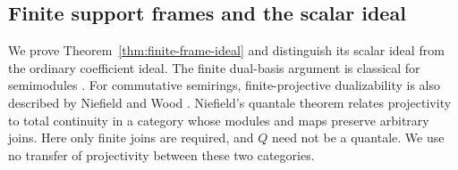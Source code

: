 \subsection{Finite support frames and the scalar ideal}
\label{subsec:finite-frame-ideal}

We prove Theorem~\ref{thm:finite-frame-ideal} and distinguish its scalar
ideal from the ordinary coefficient ideal. The finite dual-basis
argument is classical for semimodules \cite{DeorePatil}. For commutative
semirings, finite-projective dualizability is also described by
Niefield and Wood \cite[Corollary~2.2 and its proof, pp.~1223--1225]{NW}.
Niefield's quantale theorem \cite[Theorem~4.4, p.~848]{Niefield} relates
projectivity to total continuity in a category whose modules and maps
preserve arbitrary joins. Here only finite joins are required, and $Q$
need not be a quantale. We use no transfer of projectivity between these
two categories.

